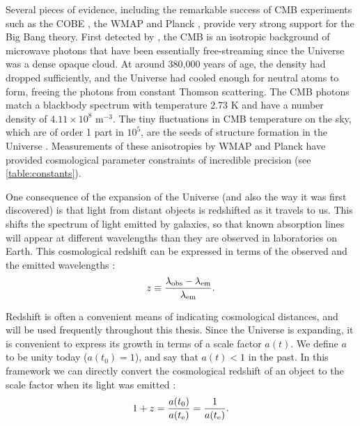 Several pieces of evidence, including the remarkable success of \acf{CMB} experiments such as the \acf{COBE} \citep{COBE96}, the \acf{WMAP} \citep{WMAP9} and \acs{Planck} \citep{PlanckXVI}, provide very strong support for the Big Bang theory. First detected by \citet{PenziasWilson65}, the \ac{CMB} is an isotropic background of microwave photons that have been essentially free-streaming since the Universe was a dense opaque cloud. At around 380,000 years of age, the density had dropped sufficiently, and the Universe had cooled enough for neutral atoms to form, freeing the photons from constant Thomson scattering. The \ac{CMB} photons match a blackbody spectrum with temperature 2.73 K and have a number density of $4.11 \times 10^8$ m$^{-3}$. The tiny fluctuations in \ac{CMB} temperature on the sky, which are of order 1 part in $10^5$, are the seeds of structure formation in the Universe \citep{RydenText}. Measurements of these anisotropies by \ac{WMAP} and \acs{Planck} have provided cosmological parameter constraints of incredible precision (see \autoref{table:constants}).

One consequence of the expansion of the Universe (and also the way it was first discovered) is that light from distant objects is redshifted as it travels to us. This shifts the spectrum of light emitted by galaxies, so that known absorption lines will appear at different wavelengths than they are observed in laboratories on Earth. This cosmological redshift can be expressed in terms of the observed and the emitted wavelengths \citep{RydenText}:
\begin{equation}
z \equiv \frac{\lambda_{\rm obs} - \lambda_{\rm em}}{\lambda_{\rm em}}.
\end{equation}

Redshift is often a convenient means of indicating cosmological distances, and will be used frequently throughout this thesis. Since the Universe is expanding, it is convenient to express its growth in terms of a scale factor $a(t)$. We define $a$ to be unity today ($a(t_0)=1$), and say that $a(t)<1$ in the past. In this framework we can directly convert the cosmological redshift of an object to the scale factor when its light was emitted \citep{RydenText}:
\begin{equation}
1+z = \frac{a(t_0)}{a(t_{\rm e})} = \frac{1}{a(t_{\rm e})}.
\label{eq:z}
\end{equation}

